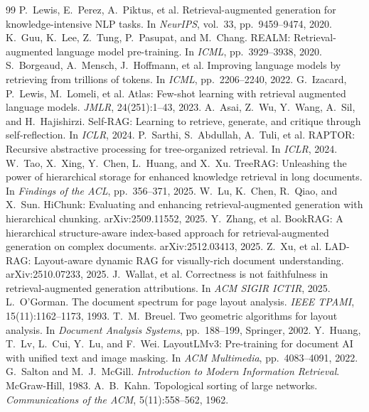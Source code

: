 \documentclass[12pt,a4paper]{report}
\begin{document}
\clearpage
\renewcommand{\bibname}{REFERENCES}
\begin{thebibliography}{99}
 P.~Lewis, E.~Perez, A.~Piktus, et al. Retrieval-augmented generation for knowledge-intensive NLP tasks. In \textit{NeurIPS}, vol.~33, pp.~9459--9474, 2020.
 K.~Guu, K.~Lee, Z.~Tung, P.~Pasupat, and M.~Chang. REALM: Retrieval-augmented language model pre-training. In \textit{ICML}, pp.~3929--3938, 2020.
 S.~Borgeaud, A.~Mensch, J.~Hoffmann, et al. Improving language models by retrieving from trillions of tokens. In \textit{ICML}, pp.~2206--2240, 2022.
 G.~Izacard, P.~Lewis, M.~Lomeli, et al. Atlas: Few-shot learning with retrieval augmented language models. \textit{JMLR}, 24(251):1--43, 2023.
 A.~Asai, Z.~Wu, Y.~Wang, A.~Sil, and H.~Hajishirzi. Self-RAG: Learning to retrieve, generate, and critique through self-reflection. In \textit{ICLR}, 2024.
 P.~Sarthi, S.~Abdullah, A.~Tuli, et al. RAPTOR: Recursive abstractive processing for tree-organized retrieval. In \textit{ICLR}, 2024.
 W.~Tao, X.~Xing, Y.~Chen, L.~Huang, and X.~Xu. TreeRAG: Unleashing the power of hierarchical storage for enhanced knowledge retrieval in long documents. In \textit{Findings of the ACL}, pp.~356--371, 2025.
 W.~Lu, K.~Chen, R.~Qiao, and X.~Sun. HiChunk: Evaluating and enhancing retrieval-augmented generation with hierarchical chunking. arXiv:2509.11552, 2025.
 Y.~Zhang, et al. BookRAG: A hierarchical structure-aware index-based approach for retrieval-augmented generation on complex documents. arXiv:2512.03413, 2025.
 Z.~Xu, et al. LAD-RAG: Layout-aware dynamic RAG for visually-rich document understanding. arXiv:2510.07233, 2025.
 J.~Wallat, et al. Correctness is not faithfulness in retrieval-augmented generation attributions. In \textit{ACM SIGIR ICTIR}, 2025.
 L.~O'Gorman. The document spectrum for page layout analysis. \textit{IEEE TPAMI}, 15(11):1162--1173, 1993.
 T.~M.~Breuel. Two geometric algorithms for layout analysis. In \textit{Document Analysis Systems}, pp.~188--199, Springer, 2002.
 Y.~Huang, T.~Lv, L.~Cui, Y.~Lu, and F.~Wei. LayoutLMv3: Pre-training for document AI with unified text and image masking. In \textit{ACM Multimedia}, pp.~4083--4091, 2022.
 G.~Salton and M.~J.~McGill. \textit{Introduction to Modern Information Retrieval}. McGraw-Hill, 1983.
 A.~B.~Kahn. Topological sorting of large networks. \textit{Communications of the ACM}, 5(11):558--562, 1962.
\end{thebibliography}
\end{document}

